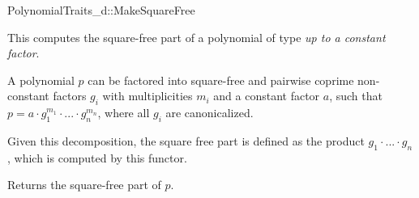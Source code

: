 \begin{ccRefConcept}{PolynomialTraits_d::MakeSquareFree}
\ccDefinition

This  computes the square-free part of 
a polynomial of type   
{\em up to a constant factor}.  

A polynomial $p$ can be  factored into square-free and pairwise coprime 
non-constant factors $g_i$ with multiplicities $m_i$ and a constant factor $a$, 
such that $p = a  \cdot  g_1^{m_1}  \cdot  ...  \cdot  g_n^{m_n}$, where all $g_i$ are canonicalized.

Given this decomposition, the square free part is defined as the product $g_1  \cdot  ...  \cdot  g_n$, 
which is computed by this functor. 

\ccRefines 
{}

\ccTypes

\ccGlue
{}

\ccOperations
{}
         { Returns the square-free part of $p$.}



\ccSeeAlso

\\
\\
\\

\end{ccRefConcept}
